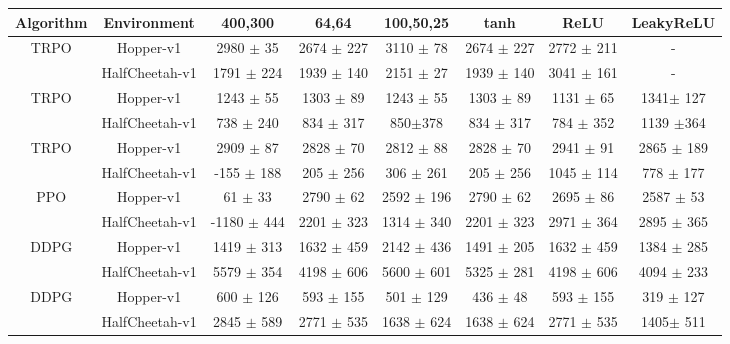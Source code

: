 \documentclass[letterpaper]{article} %
\begin{document}
\begin{table}
    \centering
    \scriptsize{\begin{tabular}{|c|c|c|c|c|c|c|c|}
    \hline
         \textbf{Algorithm} & \textbf{Environment} & \textbf{400,300} & \textbf{64,64} & \textbf{100,50,25} & \textbf{tanh} & \textbf{ReLU} & \textbf{LeakyReLU} \\
         \hline
         TRPO& Hopper-v1 & 2980 $\pm$ 35& 2674 $\pm$ 227& 3110 $\pm$ 78 &2674 $\pm$ 227 & 2772 $\pm$ 211& - \\
         \cite{TRPO}& HalfCheetah-v1 & 1791 $\pm$ 224 &1939 $\pm$ 140 &2151 $\pm$ 27 & 1939 $\pm$ 140 & 3041 $\pm$ 161 &- \\
         \hline
         TRPO& Hopper-v1 & 1243 $\pm$ 55& 1303 $\pm$ 89& 1243 $\pm$ 55 &1303 $\pm$ 89& 1131 $\pm$ 65 & 1341$\pm$ 127\\
         \cite{rllab}& HalfCheetah-v1 &738 $\pm$ 240&834 $\pm$ 317 &850$\pm$378 &834 $\pm$ 317 & 784 $\pm$ 352&1139 $\pm$364 \\
         \hline
         TRPO& Hopper-v1 & 2909 $\pm$ 87 & 2828 $\pm$ 70 & 2812 $\pm$ 88 &2828 $\pm$ 70& 2941 $\pm$ 91 & 2865 $\pm$ 189 \\
         \cite{PPO}& HalfCheetah-v1 & -155 $\pm$ 188 & 205 $\pm$ 256 & 306 $\pm$ 261 & 205 $\pm$ 256 & 1045 $\pm$ 114 & 778 $\pm$ 177 \\
         \hline
         PPO& Hopper-v1 & 61 $\pm$ 33 & 2790 $\pm$ 62 & 2592 $\pm$ 196 & 2790 $\pm$ 62 & 2695 $\pm$ 86& 2587 $\pm$ 53 \\
         \cite{PPO}& HalfCheetah-v1 & -1180 $\pm$ 444 & 2201 $\pm$ 323 &1314 $\pm$ 340 &  2201 $\pm$ 323 & 2971 $\pm$ 364 & 2895 $\pm$ 365 \\
         \hline
         DDPG& Hopper-v1 & 1419 $\pm$ 313  & 1632 $\pm$ 459  & 2142 $\pm$ 436 & 1491 $\pm$ 205  & 1632 $\pm$ 459 & 1384 $\pm$ 285 \\
         \cite{plappert2017parameter}& HalfCheetah-v1 & 5579 $\pm$ 354 & 4198 $\pm$ 606 & 5600 $\pm$ 601 & 5325 $\pm$ 281 & 4198 $\pm$ 606  &  4094 $\pm$ 233\\
         \hline
         DDPG& Hopper-v1 & 600 $\pm$ 126 &593 $\pm$ 155 &501 $\pm$ 129 &436 $\pm$ 48 & 593 $\pm$ 155& 319 $\pm$ 127 \\
         ~\cite{QPROP}& HalfCheetah-v1 & 2845 $\pm$ 589& 2771 $\pm$ 535& 1638 $\pm$ 624& 1638 $\pm$ 624& 2771 $\pm$ 535& 1405$\pm$ 511  \\

\end{tabular}}
\end{table}
\end{document}
